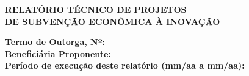 \documentclass[a4paper,12pt]{article}
\begin{document}
    \thispagestyle{empty}
\thisfancypage{\setlength{\fboxsep}{15pt}\doublebox}{}

\vspace*{8cm} 

\noindent
{}

\vspace{5cm}

\begin{center}
    \Large\textbf{RELATÓRIO TÉCNICO DE PROJETOS \\ DE SUBVENÇÃO ECONÔMICA À INOVAÇÃO}
\end{center}

\vspace{1cm}
\raggedright
\textbf{Termo de Outorga, Nº:} \\
\vspace{0.5cm}
\textbf{Beneficiária Proponente:} \\
\vspace{0.5cm}
\textbf{Período de execução deste relatório \fontsize{8}{10}\selectfont(mm/aa a mm/aa):}

\newpage  


     
\tableofcontents  %

\restoregeometry

\newpage

\pagestyle{fancy}
\renewcommand{\headrulewidth}{0pt} %
\end{document}

